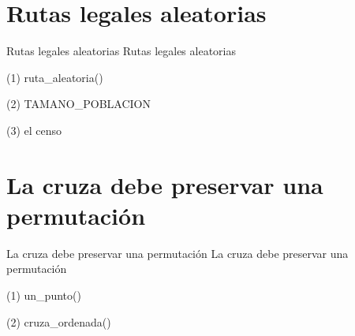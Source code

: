 \section{Rutas legales aleatorias}

\begin{frame}{Rutas legales aleatorias}
Rutas legales aleatorias
\end{frame}

\begin{frame}[fragile]{(1) ruta\_aleatoria()}

\end{frame}

\begin{frame}[fragile]{(2) TAMANO\_POBLACION}

\end{frame}

\begin{frame}[fragile]{(3) el censo}

\end{frame}


\section{La cruza debe preservar una permutación}

\begin{frame}{La cruza debe preservar una permutación}
La cruza debe preservar una permutación
\end{frame}

\begin{frame}[fragile]{(1) un\_punto()}

\end{frame}

\begin{frame}[fragile]{(2) cruza\_ordenada()}

\end{frame}

